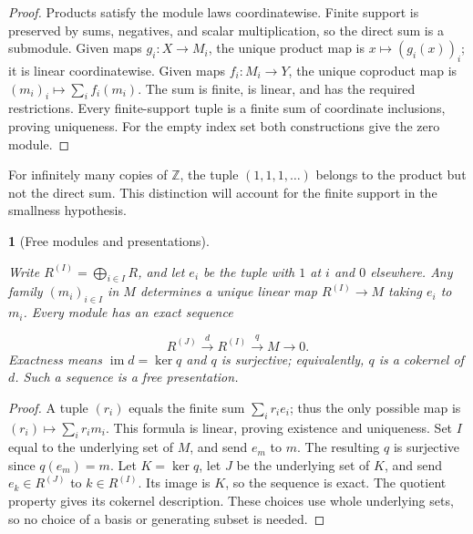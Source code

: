 \documentclass[11pt,a4paper]{article}
\newcommand{\mathheading}{}
\theoremstyle{plain}
\newtheorem*{plainstatement}{\mathheading}
\theoremstyle{definition}
\newenvironment{mathstatement}[3]{\renewcommand{\mathheading}{#1 #2}\begin{plainstatement}[#3]}{\end{plainstatement}}
\begin{document}
\begin{proof}

Products satisfy the module laws coordinatewise. Finite support is preserved by sums, negatives, and scalar multiplication, so the direct sum is a submodule. Given maps \(g_i:X\to M_i\), the unique product map is \(x\mapsto(g_i(x))_i\); it is linear coordinatewise. Given maps \(f_i:M_i\to Y\), the unique coproduct map is \((m_i)_i\mapsto\sum_i f_i(m_i)\). The sum is finite, is linear, and has the required restrictions. Every finite-support tuple is a finite sum of coordinate inclusions, proving uniqueness. For the empty index set both constructions give the zero module.


\end{proof}
 
For infinitely many copies of \(\mathbb Z\), the tuple \((1,1,1,\ldots)\) belongs to the product but not the direct sum. This distinction will account for the finite support in the smallness hypothesis.

 
\begin{mathstatement}{Theorem}{5.8}{Free modules and presentations}
\label{env-5-8}

Write \(R^{(I)}=\bigoplus_{i\in I}R\), and let \(e_i\) be the tuple with \(1\) at \(i\) and \(0\) elsewhere. Any family \((m_i)_{i\in I}\) in \(M\) determines a unique linear map \(R^{(I)}\to M\) taking \(e_i\) to \(m_i\). Every module has an exact sequence

 \[R^{(J)}\xrightarrow{d}R^{(I)}\xrightarrow{q}M\longrightarrow0.\] 
Exactness means \(\operatorname{im}d=\ker q\) and \(q\) is surjective; equivalently, \(q\) is a cokernel of \(d\). Such a sequence is a \emph{free presentation}.


\par{}\par

\end{mathstatement}
 
\begin{proof}

A tuple \((r_i)\) equals the finite sum \(\sum_i r_i e_i\); thus the only possible map is \((r_i)\mapsto\sum_i r_i m_i\). This formula is linear, proving existence and uniqueness. Set \(I\) equal to the underlying set of \(M\), and send \(e_m\) to \(m\). The resulting \(q\) is surjective since \(q(e_m)=m\). Let \(K=\ker q\), let \(J\) be the underlying set of \(K\), and send \(e_k\in R^{(J)}\) to \(k\in R^{(I)}\). Its image is \(K\), so the sequence is exact. The quotient property gives its cokernel description. These choices use whole underlying sets, so no choice of a basis or generating subset is needed.


\end{proof}
 
\end{document}
